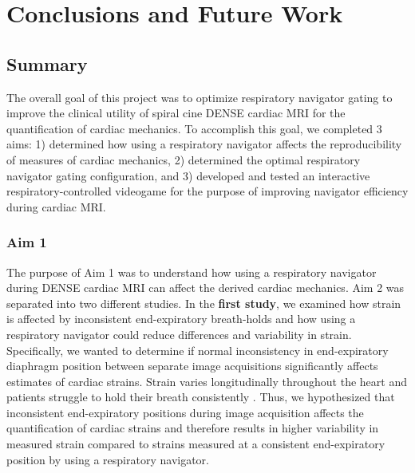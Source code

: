 \chapter{Conclusions and Future Work}

\section{Summary}
	The overall goal of this project was to optimize respiratory navigator gating to improve the clinical utility of spiral cine DENSE cardiac MRI for the quantification of cardiac mechanics. To accomplish this goal, we completed 3 aims: 1) determined how using a respiratory navigator affects the reproducibility of measures of cardiac mechanics, 2) determined the optimal respiratory navigator gating configuration, and 3) developed and tested an interactive respiratory-controlled videogame for the purpose of improving navigator efficiency during cardiac MRI.

\subsection{Aim 1}
	The purpose of Aim 1 was to understand how using a respiratory navigator during DENSE cardiac MRI can affect the derived cardiac mechanics. Aim 2 was separated into two different studies. In the \textbf{first study}, we examined how strain is affected by inconsistent end-expiratory breath-holds and how using a respiratory navigator could reduce differences and variability in strain. Specifically, we wanted to determine if normal inconsistency in end-expiratory diaphragm position between separate image acquisitions significantly affects estimates of cardiac strains. Strain varies longitudinally throughout the heart \cite{Kuijer2002,Moore2000,Young1994a,Feng2009,NasiraeiMoghaddam2010,Donekal2013a,Suever2017} and patients struggle to hold their breath consistently \cite{Liu1993,Wang1995a,Taylor1997a,Holland1998c,Fischer2006a}. Thus, we hypothesized that inconsistent end-expiratory positions during image acquisition affects the quantification of cardiac strains and therefore results in higher variability in measured strain compared to strains measured at a consistent end-expiratory position by using a respiratory navigator.

